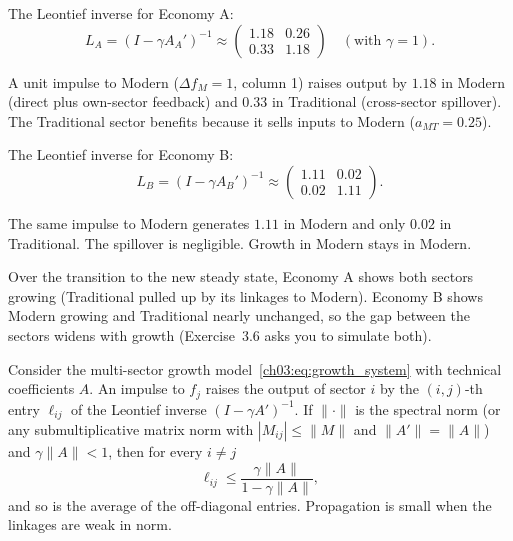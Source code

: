 \documentclass[../structural_economics_book.tex]{subfiles}
\begin{document}
\begin{example}\label{ch03:ex:propagation}
The Leontief inverse for Economy A:
\begin{equation}
L_A = (I - \gamma A_A')^{-1} \approx \begin{pmatrix} 1.18 & 0.26 \\ 0.33 & 1.18 \end{pmatrix} \quad (\text{with } \gamma = 1).
\end{equation}

A unit impulse to Modern ($\Delta f_M = 1$, column 1) raises output by $1.18$ in Modern (direct plus own-sector feedback) and $0.33$ in Traditional (cross-sector spillover). The Traditional sector benefits because it sells inputs to Modern ($a_{MT} = 0.25$).

The Leontief inverse for Economy B:
\begin{equation}
L_B = (I - \gamma A_B')^{-1} \approx \begin{pmatrix} 1.11 & 0.02 \\ 0.02 & 1.11 \end{pmatrix}.
\end{equation}

The same impulse to Modern generates $1.11$ in Modern and only $0.02$ in Traditional. The spillover is negligible. Growth in Modern stays in Modern.

Over the transition to the new steady state, Economy A shows both sectors growing (Traditional pulled up by its linkages to Modern). Economy B shows Modern growing and Traditional nearly unchanged, so the gap between the sectors widens with growth (Exercise~3.6 asks you to simulate both).
\end{example}

\begin{proposition}\label{ch03:prop:propagation}
Consider the multi-sector growth model~\eqref{ch03:eq:growth_system} with technical coefficients $A$. An impulse to $f_j$ raises the output of sector $i$ by the $(i,j)$-th entry $\ell_{ij}$ of the Leontief inverse $(I - \gamma A')^{-1}$. If $\|\cdot\|$ is the spectral norm (or any submultiplicative matrix norm with $|M_{ij}| \le \|M\|$ and $\|A'\| = \|A\|$) and $\gamma\|A\| < 1$, then for every $i \neq j$
\begin{equation}
\ell_{ij} \leq \frac{\gamma \|A\|}{1 - \gamma\|A\|},
\end{equation}
and so is the average of the off-diagonal entries. Propagation is small when the linkages are weak in norm.
\end{proposition}
\end{document}
